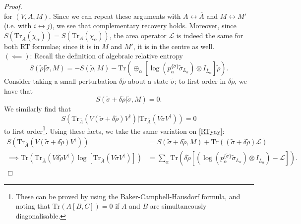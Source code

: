 \documentclass[12pt,a4paper]{report}
\numberwithin{equation}{section}
\newcommand{\ol}[1]{\overline{#1}}
\newcommand{\tr}{\text{Tr}}
\theoremstyle{definition}
\theoremstyle{theorem}
\theoremstyle{theorem}
\theoremstyle{example}
\theoremstyle{definition}
\begin{document}
\begin{proof}
\begin{equation}
	\end{equation}
	for $(V,A,M)$. Since we can repeat these arguments with $A\leftrightarrow\ol{A}$ and $M\leftrightarrow M'$ (i.e. with $i\leftrightarrow j$), we see that complementary recovery holds. Moreover, since $S\left(\tr_{\ol{A}}\left(\chi_{\alpha}\right)\right)=S\left(\tr_{A}\left(\chi_{\alpha}\right)\right)$, the area operator $\mathcal{L}$ is indeed the same for both RT formulae; since it is in $M$ and $M'$, it is in the centre as well.\\
	$(\impliedby)$: Recall the definition of algebraic relative entropy
	\begin{equation}
		S(\tilde{\rho}|\tilde{\sigma},M)=-S(\tilde{\rho},M)-\tr\left(\oplus_{\alpha}\left[\log\left(p_{\alpha}^{\{\tilde{\sigma}\}}\tilde{\sigma}_{L_{\alpha}}\right)\otimes I_{\ol{L}_{\alpha}}\right]\tilde{\rho}\right).
	\end{equation}
	Consider taking a small perturbation $\delta\tilde{\rho}$ about a state $\tilde{\sigma}$; to first order in $\delta\tilde{\rho}$, we have that
	\begin{equation}
		S(\tilde{\sigma}+\delta\tilde{\rho}|\tilde{\sigma},M)=0.
	\end{equation}
	We similarly find that
	\begin{equation}
		S\left(\tr_{\ol{A}}\left(V\left(\tilde{\sigma}+\delta\tilde{\rho}\right)V^{\dagger}\right)|\tr_{\ol{A}}\left(V\tilde{\sigma}V^{\dagger}\right)\right)=0
	\end{equation}
	to first order\footnote{These can be proved by using the Baker-Campbell-Hausdorf formula, and noting that $\tr(A[B,C])=0$ if $A$ and $B$ are simultaneously diagonalisable.}. Using these facts, we take the same variation on \ref{RTyay}:
	\begin{equation}
		\begin{aligned}
			S\left(\tr_{\ol{A}}\left(V\left(\tilde{\sigma}+\delta\tilde{\rho}\right)V^{\dagger}\right)\right)&=S(\tilde{\sigma}+\delta\tilde{\rho},M)+\tr\left(\left(\tilde{\sigma}+\delta\tilde{\rho}\right)\mathcal{L}\right)\\
			\implies \tr\left(\tr_{\ol{A}}\left(V\delta\tilde{\rho} V^{\dagger}\right)\log\left[\tr_{\ol{A}}\left(V\tilde{\sigma} V^{\dagger}\right)\right]\right)&=\sum_{\alpha}\tr\left(\delta\tilde{\rho}\left[\left(\log\left(p_{\alpha}^{\{\tilde{\sigma}\}}\tilde{\sigma}_{L_{\alpha}}\right)\otimes I_{\ol{L}_{\alpha}}\right)-\mathcal{L}\right]\right).
		\end{aligned}
	\end{equation}

\end{proof}
\end{document}
